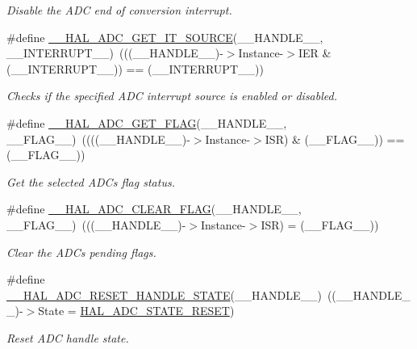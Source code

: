 \begin{DoxyCompactItemize}
\begin{DoxyCompactList}\small\item\em Disable the A\+DC end of conversion interrupt. \end{DoxyCompactList}\item 
\#define \hyperlink{group___a_d_c___exported___macros_gaf29cd943cb451e4ed1f07bd7d4854fb0}{\+\_\+\+\_\+\+H\+A\+L\+\_\+\+A\+D\+C\+\_\+\+G\+E\+T\+\_\+\+I\+T\+\_\+\+S\+O\+U\+R\+CE}(\+\_\+\+\_\+\+H\+A\+N\+D\+L\+E\+\_\+\+\_\+,  \+\_\+\+\_\+\+I\+N\+T\+E\+R\+R\+U\+P\+T\+\_\+\+\_\+)~(((\+\_\+\+\_\+\+H\+A\+N\+D\+L\+E\+\_\+\+\_\+)-\/$>$Instance-\/$>$I\+ER \& (\+\_\+\+\_\+\+I\+N\+T\+E\+R\+R\+U\+P\+T\+\_\+\+\_\+)) == (\+\_\+\+\_\+\+I\+N\+T\+E\+R\+R\+U\+P\+T\+\_\+\+\_\+))
\begin{DoxyCompactList}\small\item\em Checks if the specified A\+DC interrupt source is enabled or disabled. \end{DoxyCompactList}\item 
\#define \hyperlink{group___a_d_c___exported___macros_gaff951862689bb92173f803577cf2d447}{\+\_\+\+\_\+\+H\+A\+L\+\_\+\+A\+D\+C\+\_\+\+G\+E\+T\+\_\+\+F\+L\+AG}(\+\_\+\+\_\+\+H\+A\+N\+D\+L\+E\+\_\+\+\_\+,  \+\_\+\+\_\+\+F\+L\+A\+G\+\_\+\+\_\+)~((((\+\_\+\+\_\+\+H\+A\+N\+D\+L\+E\+\_\+\+\_\+)-\/$>$Instance-\/$>$I\+SR) \& (\+\_\+\+\_\+\+F\+L\+A\+G\+\_\+\+\_\+)) == (\+\_\+\+\_\+\+F\+L\+A\+G\+\_\+\+\_\+))
\begin{DoxyCompactList}\small\item\em Get the selected A\+DC\textquotesingle{}s flag status. \end{DoxyCompactList}\item 
\#define \hyperlink{group___a_d_c___exported___macros_gafe44e1e66141bca3665bb82981a81a17}{\+\_\+\+\_\+\+H\+A\+L\+\_\+\+A\+D\+C\+\_\+\+C\+L\+E\+A\+R\+\_\+\+F\+L\+AG}(\+\_\+\+\_\+\+H\+A\+N\+D\+L\+E\+\_\+\+\_\+,  \+\_\+\+\_\+\+F\+L\+A\+G\+\_\+\+\_\+)~(((\+\_\+\+\_\+\+H\+A\+N\+D\+L\+E\+\_\+\+\_\+)-\/$>$Instance-\/$>$I\+SR) = (\+\_\+\+\_\+\+F\+L\+A\+G\+\_\+\+\_\+))
\begin{DoxyCompactList}\small\item\em Clear the A\+DC\textquotesingle{}s pending flags. \end{DoxyCompactList}\item 
\#define \hyperlink{group___a_d_c___exported___macros_gacb290bae25b972942021331122a3600f}{\+\_\+\+\_\+\+H\+A\+L\+\_\+\+A\+D\+C\+\_\+\+R\+E\+S\+E\+T\+\_\+\+H\+A\+N\+D\+L\+E\+\_\+\+S\+T\+A\+TE}(\+\_\+\+\_\+\+H\+A\+N\+D\+L\+E\+\_\+\+\_\+)~((\+\_\+\+\_\+\+H\+A\+N\+D\+L\+E\+\_\+\+\_\+)-\/$>$State = \hyperlink{group___a_d_c___exported___types_ga3f995b6dedd7366d0663f852511b9104}{H\+A\+L\+\_\+\+A\+D\+C\+\_\+\+S\+T\+A\+T\+E\+\_\+\+R\+E\+S\+ET})
\begin{DoxyCompactList}\small\item\em Reset A\+DC handle state. \end{DoxyCompactList}\end{DoxyCompactItemize}


